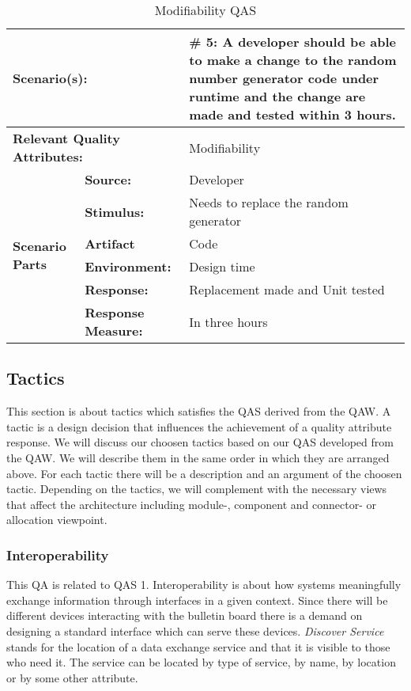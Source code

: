 \begin{table}[H]
\begin{center}
\begin{tabular}{|p{0.3cm}|p{2.5cm}|p{8cm}|}
  \hline
  \multicolumn{2}{|p{3cm}|}{\bfseries Scenario(s):} & \#  5: A developer should be able to make a change to the random number generator code under runtime and the change are made and tested within 3 hours. \\
  \hline
  \multicolumn{2}{|p{3cm}|}{\bfseries Relevant Quality Attributes:} & Modifiability\\
  \hline
  \multirow{6}{*}{\begin{sideways}{\bfseries Scenario Parts}\end{sideways}}
  & {\bfseries Source:} & Developer \\
  \cline{2-3}
  & {\bfseries Stimulus:} & Needs to replace the random generator \\
  \cline{2-3}
  & {\bfseries Artifact} &  Code \\
  \cline{2-3}
  & {\bfseries Environment:} &  Design time \\
  \cline{2-3}
  & {\bfseries Response:} &  Replacement made and Unit tested\\
  \cline{2-3}
  & {\bfseries Response Measure:} & In three hours\\
  \hline
\end{tabular}
\caption{Modifiability QAS}
\end{center}
\end{table}








\subsection{Tactics}
This section is about tactics which satisfies the QAS derived from the QAW. A tactic is a design decision that influences the achievement of a quality attribute response. We will discuss our choosen tactics based on our QAS developed from the QAW. We will describe them in the same order in which they are arranged above. For each tactic there will be a description and an argument of the choosen tactic. Depending on the tactics, we will complement with the necessary views that affect the architecture including module-, component and connector- or allocation viewpoint. 


\noindent
\subsubsection{Interoperability} \label{sec:interoperability:restapi}
This QA is related to QAS 1. Interoperability is about how systems meaningfully exchange information through interfaces in a given context. Since there will be different devices interacting with the bulletin board there is a demand on designing a standard interface which can serve these devices. \textit{Discover Service} stands for the location of a data exchange service and that it is visible to those who need it. The service can be located by type of service, by name, by location or by some other attribute.

